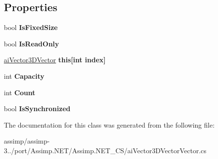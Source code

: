 \subsection*{Properties}
\begin{DoxyCompactItemize}
\item 
\hypertarget{classai_vector3_d_vector_vector_a56709342b899e554f81a21514cbf175f}{bool {\bfseries Is\+Fixed\+Size}}\label{classai_vector3_d_vector_vector_a56709342b899e554f81a21514cbf175f}

\item 
\hypertarget{classai_vector3_d_vector_vector_ae60429e6c7a6474fe94828894c8f57ee}{bool {\bfseries Is\+Read\+Only}}\label{classai_vector3_d_vector_vector_ae60429e6c7a6474fe94828894c8f57ee}

\item 
\hypertarget{classai_vector3_d_vector_vector_a420cc44a17413841795b25ff8eaa028a}{\hyperlink{classai_vector3_d_vector}{ai\+Vector3\+D\+Vector} {\bfseries this\mbox{[}int index\mbox{]}}}\label{classai_vector3_d_vector_vector_a420cc44a17413841795b25ff8eaa028a}

\item 
\hypertarget{classai_vector3_d_vector_vector_a555f48e8f4117719910570f42cbbd38b}{int {\bfseries Capacity}}\label{classai_vector3_d_vector_vector_a555f48e8f4117719910570f42cbbd38b}

\item 
\hypertarget{classai_vector3_d_vector_vector_a5cf1f0a0f7c691300fad1ec1712d439f}{int {\bfseries Count}}\label{classai_vector3_d_vector_vector_a5cf1f0a0f7c691300fad1ec1712d439f}

\item 
\hypertarget{classai_vector3_d_vector_vector_ac30bd52917ce3d3e51aa541e181e4a87}{bool {\bfseries Is\+Synchronized}}\label{classai_vector3_d_vector_vector_ac30bd52917ce3d3e51aa541e181e4a87}

\end{DoxyCompactItemize}


The documentation for this class was generated from the following file\+:\begin{DoxyCompactItemize}
\item 
assimp/assimp-\/3../port/\+Assimp.\+N\+E\+T/\+Assimp.\+N\+E\+T\+\_\+\+C\+S/ai\+Vector3\+D\+Vector\+Vector.\+cs\end{DoxyCompactItemize}
